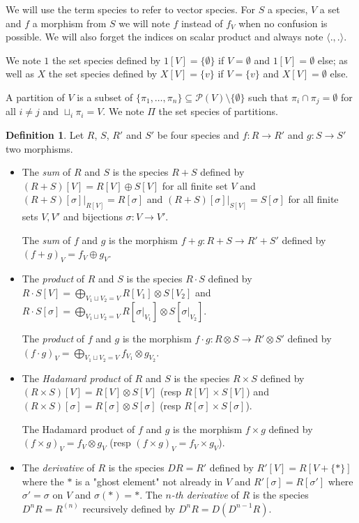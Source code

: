 \documentclass[a4paper]{article}
\DeclareMathOperator{\id}{id}
\theoremstyle{definition}
\newtheorem{definition}{Definition}
\begin{document}
We will use the term species to refer to vector species. For $S$ a species, $V$ a set and $f$ a morphism from $S$ we will note $f$ instead of $f_V$ when no confusion is possible. We will also forget the indices on scalar product and always note $\langle ., .\rangle$.

We note $1$ the set species defined by $1[V] = \{\emptyset\}$ if $V=\emptyset$ and $1[V] = \emptyset$ else; as well as $X$ the set species defined by $X[V] = \{v\}$ if $V=\{v\}$ and $X[V] = \emptyset$ else.

A partition of $V$ is a subset of $\{\pi_1,\dots, \pi_n\} \subseteq \mathcal{P}(V)\setminus\{\emptyset\}$ such that $\pi_i\cap \pi_j = \emptyset$ for all $i\not = j$ and $\sqcup_i \pi_i = V$. We note $\Pi$ the set species of partitions.

\begin{definition}
Let $R$, $S$, $R'$ and $S'$ be four species and $f:R\rightarrow R'$ and $g:S\rightarrow S'$ two morphisms.
\begin{itemize}
\item The \textit{sum} of $R$ and $S$ is the species $R+ S$ defined by $(R+S)[V] = R[V]\oplus S[V]$ for all finite set $V$ and $(R+S)[\sigma]|_{R[V]} = R[\sigma]$ and $(R+ S)[\sigma]|_{S[V]} = S[\sigma]$ for all finite sets $V,V'$ and bijections $\sigma: V\rightarrow V'$.

The \textit{sum} of $f$ and $g$ is the morphism $f+ g: R +S\rightarrow R'+ S'$ defined by $(f+g)_V = f_V\oplus g_V$.
\item The \textit{product} of $R$ and $S$ is the species $R\cdot S$ defined by $R\cdot S[V] = \bigoplus_{V_1\sqcup V_2 = V} R[V_1]\otimes S[V_2]$ and $R\cdot S[\sigma] = \bigoplus_{V_1\sqcup V_2 = V} R[\sigma|_{V_1}]\otimes S[\sigma|_{V_2}]$.

The \textit{product} of $f$ and $g$ is the morphism $f\cdot g: R\otimes S\rightarrow R'\otimes S'$ defined by $(f\cdot g)_V = \bigoplus_{V_1\sqcup V_2 = V}f_{V_1}\otimes g_{V_2}$.
\item The \textit{Hadamard product} of $R$ and $S$ is the species $R\times S$ defined by $(R\times S)[V] = R[V]\otimes S[V]$ (resp $R[V]\times S[V]$) and $(R\times S)[\sigma] = R[\sigma]\otimes S[\sigma]$ (resp $R[\sigma]\times S[\sigma]$).

The Hadamard product of $f$ and $g$ is the morphism $f\times g$ defined by $(f\times g)_V = f_V\otimes g_V$ (resp $(f\times g)_V = f_V\times g_V$).
\item The \textit{derivative} of $R$ is the species $DR=R'$ defined by $R'[V] = R[V+\{\ast\}]$ where the $\ast$ is a "ghost element" not already in $V$ and $R'[\sigma]= R[\sigma']$ where $\sigma' = \sigma$ on $V$ and $\sigma(\ast) = \ast$. The \textit{$n$-th derivative} of $R$ is the species $D^nR=R^{(n)}$ recursively defined by $D^nR = D(D^{n-1}R)$.


\end{itemize}
\end{definition}
\end{document}
